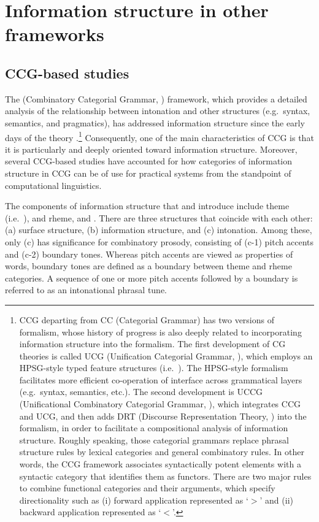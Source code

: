  \largerpage[-1]
\section{Information structure in other frameworks}
\label{8:sec:other-frameworks}


\subsection{CCG-based studies}
\label{8:ssec:ccg}

The  (Combinatory Categorial Grammar, \citealt{steedman:01})
framework, which provides a detailed analysis of the relationship
between intonation and other structures (e.g.\ syntax, semantics, and
pragmatics), has addressed information structure since the early days
of the theory \citep{steedman:00}.\footnote{CCG departing from CC
  (Categorial Grammar) has two versions of formalism, whose history of
  progress is also deeply related to incorporating information
  structure into the formalism. The first development of CG theories
  is called UCG (Unification Categorial Grammar, \citealt{zeevat:87}),
  which employs an HPSG-style typed feature structures
  (i.e.\ ). The HPSG-style formalism facilitates more
  efficient co-operation of interface across grammatical layers
  (e.g.\ syntax, semantics, etc.). The second development is UCCG
  (Unificational Combinatory Categorial Grammar,
  \citealt{traat:bos:04}), which integrates CCG and UCG, and then adds
  DRT (Discourse Representation Theory, \citealt{kamp:reyle:93}) into
  the formalism, in order to facilitate a compositional analysis of
  information structure.  Roughly speaking, those categorial grammars
  replace phrasal structure rules by lexical categories and general
  combinatory rules. In other words, the CCG framework associates
  syntactically potent elements with a syntactic category that
  identifies them as functors. There are two major rules to combine
  functional categories and their arguments, which specify
  directionality such as (i) forward application represented as
  `\ensuremath{>}' and (ii) backward application represented as
  `\ensuremath{<}'.} Consequently, one of the main characteristics of
CCG is that it is particularly and deeply oriented toward information
structure. Moreover, several CCG-based studies have accounted for how
categories of information structure in CCG can be of use for practical
systems from the standpoint of computational linguistics.


The components of information structure that \citet{steedman:00} and
\citet{traat:bos:04} introduce include theme (i.e.\ ), and rheme,
and . There are three structures that coincide with each other:
(a) surface structure, (b) information structure, and (c) intonation.
Among these, only (c) has significance for combinatory prosody,
consisting of (c-1) pitch accents and (c-2) boundary tones. Whereas
pitch accents are viewed as properties of words, boundary tones are
defined as a boundary between theme and rheme categories.  A sequence
of one or more pitch accents followed by a boundary is referred to as
an intonational phrasal tune.


